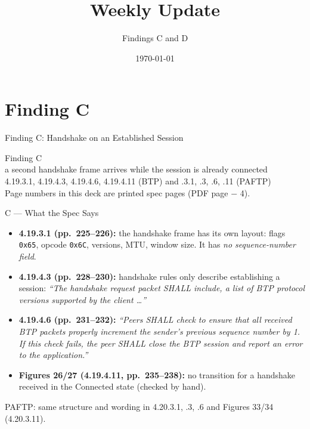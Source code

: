 \documentclass[10pt,aspectratio=169,t]{beamer}
\title{Weekly Update}
\subtitle{Findings C and D}
\author{}
\date{\today}
\newcommand{\spec}[1]{\textcolor{blue!50!black}{\small\itshape #1}}
\begin{document}
\frame{\titlepage}

\section{Finding C}

\begin{frame}{Finding C: Handshake on an Established Session}
\begin{center}
\Large Finding C\\[4pt]
\normalsize a second handshake frame arrives while the session is already connected\\[4pt]
\small 4.19.3.1, 4.19.4.3, 4.19.4.6, 4.19.4.11 (BTP) \quad and .3.1, .3, .6, .11 (PAFTP)\\[2pt]
\footnotesize Page numbers in this deck are printed spec pages (PDF page $-$ 4).
\end{center}
\end{frame}

\begin{frame}{C --- What the Spec Says}
\small
\begin{itemize}
  \item \textbf{4.19.3.1 (pp.~225--226):} the handshake frame has its own
        layout: flags \texttt{0x65}, opcode \texttt{0x6C}, versions, MTU, window
        size. It has \emph{no sequence-number field}.
  \item \textbf{4.19.4.3 (pp.~228--230):} handshake rules only describe
        establishing a session: \spec{``The handshake request packet SHALL
        include, a list of BTP protocol versions supported by the client
        \ldots''}
  \item \textbf{4.19.4.6 (pp.~231--232):} \spec{``Peers SHALL check to ensure
        that all received BTP packets properly increment the sender's previous
        sequence number by 1. If this check fails, the peer SHALL close the BTP
        session and report an error to the application.''}
  \item \textbf{Figures 26/27 (4.19.4.11, pp.~235--238):} no transition for a
        handshake received in the Connected state (checked by hand).
\end{itemize}
\footnotesize PAFTP: same structure and wording in 4.20.3.1, .3, .6 and
Figures 33/34 (4.20.3.11).
\end{frame}
\end{document}
